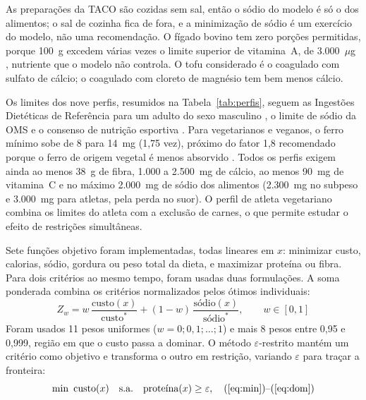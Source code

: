 \documentclass[12pt]{article}
\begin{document}
As preparações da TACO são cozidas sem sal, então o sódio do modelo é só o dos
alimentos; o sal de cozinha fica de fora, e a minimização de sódio é um exercício do
modelo, não uma recomendação. O fígado bovino tem zero porções permitidas, porque 100~g
excedem várias vezes o limite superior de vitamina~A, de 3.000~$\mu$g \cite{iom2006},
nutriente que o modelo não controla. O tofu considerado é o coagulado com sulfato de
cálcio; o coagulado com cloreto de magnésio tem bem menos cálcio.

Os limites dos nove perfis, resumidos na Tabela~\ref{tab:perfis}, seguem as
Ingestões Dietéticas de Referência para um adulto do sexo masculino \cite{iom2006}, o
limite de sódio da OMS \cite{who2012} e o consenso de nutrição esportiva
\cite{thomas2016}. Para vegetarianos e veganos, o ferro
mínimo sobe de 8 para 14~mg (1,75 vez), próximo do fator 1,8 recomendado porque o ferro
de origem vegetal é menos absorvido \cite{iom2006,melina2016}. Todos os perfis exigem
ainda ao menos 38~g de fibra, 1.000 a 2.500~mg de cálcio, ao menos 90~mg de vitamina~C
e no máximo 2.000~mg de sódio dos alimentos (2.300~mg no subpeso e 3.000~mg para
atletas, pela perda no suor). O perfil de atleta vegetariano
combina os limites do atleta com a exclusão de carnes, o que permite estudar o efeito
de restrições simultâneas.

\begin{table}[ht]
\centering
\caption{Perfis nutricionais e limites diários.}\label{tab:perfis}
\footnotesize

\end{table}

Sete funções objetivo foram implementadas, todas lineares em $x$: minimizar custo,
calorias, sódio, gordura ou peso total da dieta, e maximizar proteína ou fibra. Para
dois critérios ao mesmo tempo, foram usadas duas formulações. A soma ponderada combina
os critérios normalizados pelos ótimos individuais:
\begin{equation}
Z_w = w \, \frac{\text{custo}(x)}{\text{custo}^*} + (1 - w) \, \frac{\text{sódio}(x)}{\text{sódio}^*}, \qquad w \in [0, 1]
\label{eq:ponderada}
\end{equation}
Foram usados 11 pesos uniformes ($w = 0; 0{,}1; \ldots; 1$) e mais 8 pesos entre
0,95 e 0,999, região em que o custo passa a dominar.
O método $\varepsilon$-restrito \cite{haimes1971} mantém um critério como objetivo e
transforma o outro em restrição, variando $\varepsilon$ para traçar a fronteira:
\begin{equation}
\min \ \text{custo}(x) \quad \text{s.a.} \quad \text{proteína}(x) \geq \varepsilon, \quad
\text{(\ref{eq:min})--(\ref{eq:dom})}
\label{eq:epsilon}
\end{equation}
\end{document}
